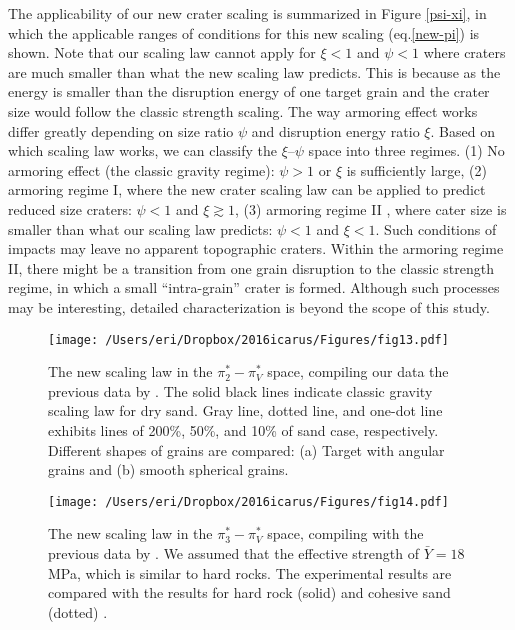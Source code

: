 \documentclass[3p,authoryear]{elsarticle}
\newcommand{\II}{I\hspace{-.1 em}I}
\begin{document}
The applicability of our new crater scaling is summarized in Figure \ref{psi-xi}, in which the applicable ranges of conditions for this new scaling (eq.\eqref{new-pi}) is shown. Note that our scaling law cannot apply for $\xi<1$ and $\psi<1$ where craters are much smaller than what the new scaling law predicts.
This is because as the energy is smaller than the disruption energy of one target grain and the crater size would follow the classic strength scaling.
The way armoring effect works differ greatly depending on size ratio $\psi$ and disruption energy ratio $\xi$.
Based on which scaling law works, we can classify the $\xi$--$\psi$ space into three regimes.
(1) No armoring effect (the classic gravity regime): $\psi>1$ or $\xi$ is sufficiently large, (2) armoring regime I, where the new crater scaling law can be applied to predict reduced size craters: $\psi<1$ and $\xi \gtrsim 1$, (3) armoring regime {\II} , where cater size is smaller than what our scaling law predicts: $\psi<1$ and $\xi<1$.
Such conditions of impacts may leave no apparent topographic craters. Within the armoring regime \II, there might be a transition from one grain disruption to the classic strength regime, in which a small ``intra-grain'' crater is formed. Although such processes may be interesting, detailed characterization is  beyond the scope of this study.

\begin{figure*}[tbp]
	\centering
	\texttt{[image: /Users/eri/Dropbox/2016icarus/Figures/fig13.pdf]}
	\caption{The new scaling law in the $\pi_2^*- \pi_V^*$ space, compiling our data the previous data by \citet{schmidt1980, mizutani1983, cintala1999, yamamoto2006, guettler2012, holsapple2014}. The solid black lines indicate classic gravity scaling law for dry sand. Gray line, dotted line, and one-dot line exhibits lines of 200\%, 50\%, and 10\% of sand case, respectively. Different shapes of grains are compared: (a) Target with angular grains and (b) smooth spherical grains.}
	\label{newpi2}
	\centering
\end{figure*}
\begin{figure}[htbp]
	\centering
	\texttt{[image: /Users/eri/Dropbox/2016icarus/Figures/fig14.pdf]}
	\caption{The new scaling law in the $\pi_3^*- \pi_V^*$ space, compiling with the previous data by \citet{schmidt1980, mizutani1983, cintala1999, yamamoto2006, guettler2012, holsapple2014}. We assumed that the effective strength of $\bar{Y}=18$ MPa, which is similar to hard rocks. The experimental results are compared with the results for hard rock (solid) and cohesive sand (dotted) \citep{schmidt1987}.}
	\label{newpi3}
	\centering
\end{figure}
\end{document}
